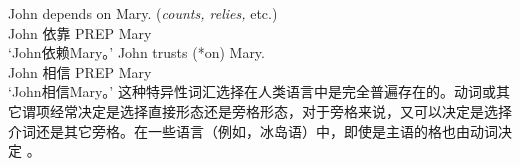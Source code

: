\begin{exe}
\begin{xlist}[iv.]
\begin{exe}
\begin{xlist}[iv.]
\eal\label{depends-on-ex}
\ex 
\gll John depends on Mary.  (\emph{counts, relies,} etc.)\\
     John 依靠 PREP Mary\\
\glt `John依赖Mary。'
\ex 
\gll John trusts (*on) Mary.\\
     John 相信 PREP Mary\\
\glt `John相信Mary。' 
\ex 
{}
\zl
这种特异性词汇选择在人类语言中是完全普遍存在的。动词或其它谓项经常决定是选择直接形态还是旁格形态，对于旁格来说，又可以决定是选择介词还是其它旁格。在一些语言（例如，冰岛语）中，即使是主语的格也由动词决定 \citep*{ZMT85a}。


\end{xlist}
\end{exe}
\end{xlist}
\end{exe}
